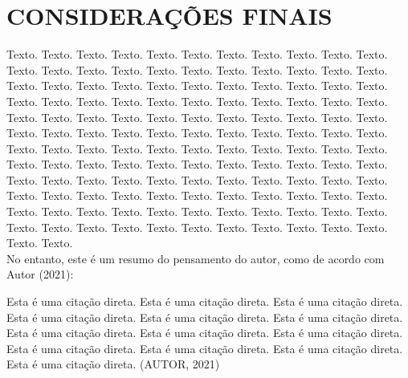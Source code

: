 \section{CONSIDERAÇÕES FINAIS}\label{sec:conclusion}

\begin{onehalfspacing}
    \begin{justify}
        \begin{large}
            \noindent Texto. Texto. Texto. Texto. Texto. Texto. Texto. Texto. Texto. Texto. Texto. Texto. Texto. Texto. Texto. Texto. Texto. Texto. Texto. Texto. Texto. Texto. Texto. Texto. Texto. Texto. Texto. Texto. Texto. Texto. Texto. Texto. Texto. Texto. Texto. Texto. Texto. Texto. Texto. Texto. Texto. Texto. Texto. Texto. Texto. Texto. Texto. Texto. Texto. Texto. Texto. Texto. Texto. Texto. Texto. Texto. Texto. Texto. Texto. Texto. Texto. Texto. Texto. Texto. Texto. Texto. Texto. Texto. Texto. Texto. Texto. Texto. Texto. Texto. Texto. Texto. Texto. Texto. Texto. Texto. Texto. Texto. Texto. Texto. Texto. Texto. Texto. Texto. Texto. Texto. Texto. Texto. Texto. Texto. Texto. Texto. Texto. Texto. Texto. Texto. Texto. Texto. Texto. Texto. Texto. Texto. Texto. Texto. Texto. Texto. Texto. Texto. Texto. Texto. Texto. Texto. Texto. Texto. Texto. Texto. Texto. Texto. Texto. Texto. Texto. Texto. Texto. Texto. Texto. Texto. Texto. Texto. Texto. Texto.\\
            
            \noindent No entanto, este é um resumo do pensamento do autor, como de acordo com Autor (2021):\\
        \end{large}
    \end{justify}
\end{onehalfspacing}

\begin{onehalfspacing}               
    \begin{center}\hspace{.20\textwidth}
        \begin{minipage}{.60\textwidth}
            \begin{small}
                Esta é uma citação direta. Esta é uma citação direta. Esta é uma citação direta. Esta é uma citação direta. Esta é uma citação direta. Esta é uma citação direta. Esta é uma citação direta. Esta é uma citação direta. Esta é uma citação direta. Esta é uma citação direta. Esta é uma citação direta. Esta é uma citação direta. Esta é uma citação direta. (AUTOR, 2021)\\
            \end{small}
        \end{minipage}
    \end{center}
\end{onehalfspacing}

\pagebreak

